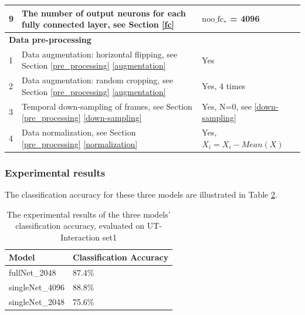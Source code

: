 \begin{table}
\begin{center}
\begin{tabular}{| m{0.6cm} | m{7cm} | m{6cm} |}
			9 &  The number of output neurons for each fully connected layer, see Section \ref{fc} & \(\text{noo\_fc}_*\) = 4096 \\ \hline \hline                           
			
			\multicolumn{3}{|l|}{\textbf{Data pre-processing}}  \\ \hline
			1 & Data augmentation: horizontal flipping, see Section \ref{pre_processing} \ref{augmentation} & Yes  \\ \hline
			2 & Data augmentation: random cropping, see Section \ref{pre_processing} \ref{augmentation} & Yes, 4 times \\ \hline
			3 & Temporal down-sampling of frames, see Section \ref{pre_processing} \ref{down-sampling} & Yes, N=0, see \ref{down-sampling} \\ \hline
			
			4 & Data normalization, see Section \ref{pre_processing} \ref{normalization} & Yes, \(X_i = X_i - Mean(X)\) \\ \hline			
		\end{tabular}
		\label{table:network_settings}
	\end{center}
\end{table} 
\subsubsection*{Experimental results}
The classification accuracy for these three models are illustrated in Table \ref{table:threeModels}.

\begin{table}
	\caption{The experimental results of the three models' classification accuracy, evaluated on UT-Interaction set1}
	\begin{center}
		\begin{tabular}{| m{4cm} | m{4cm} |}
			\hline
			Model & Classification Accuracy \\ \hline \hline
			fullNet\_2048 & 87.4\%   \\ \hline
			singleNet\_4096 & 88.8\% \\ \hline
			singleNet\_2048 & 75.6\%  \\ \hline				
		\end{tabular}
		\label{table:threeModels}
	\end{center}
\end{table}

